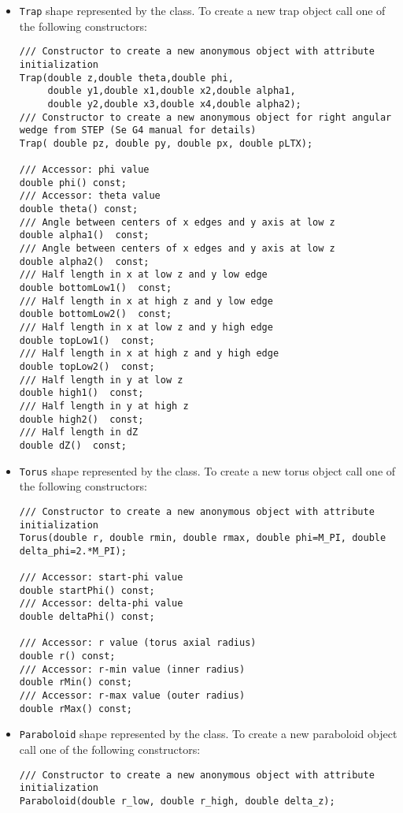 \begin{itemize}
\item \texttt{Trap} shape represented by the  class. To create a new trap object call one of the following constructors:
\begin{verbatim}
/// Constructor to create a new anonymous object with attribute initialization
Trap(double z,double theta,double phi,
     double y1,double x1,double x2,double alpha1,
     double y2,double x3,double x4,double alpha2);
/// Constructor to create a new anonymous object for right angular wedge from STEP (Se G4 manual for details)
Trap( double pz, double py, double px, double pLTX);

/// Accessor: phi value
double phi() const;
/// Accessor: theta value
double theta() const;
/// Angle between centers of x edges and y axis at low z
double alpha1()  const;
/// Angle between centers of x edges and y axis at low z
double alpha2()  const;
/// Half length in x at low z and y low edge
double bottomLow1()  const;
/// Half length in x at high z and y low edge
double bottomLow2()  const;
/// Half length in x at low z and y high edge
double topLow1()  const;
/// Half length in x at high z and y high edge
double topLow2()  const;
/// Half length in y at low z
double high1()  const;
/// Half length in y at high z
double high2()  const;
/// Half length in dZ
double dZ()  const;
\end{verbatim}

\item \texttt{Torus}  shape represented by the  class. To create a new torus object call one of the following constructors:
\begin{verbatim}
/// Constructor to create a new anonymous object with attribute initialization
Torus(double r, double rmin, double rmax, double phi=M_PI, double delta_phi=2.*M_PI);

/// Accessor: start-phi value
double startPhi() const;
/// Accessor: delta-phi value
double deltaPhi() const;

/// Accessor: r value (torus axial radius)
double r() const;
/// Accessor: r-min value (inner radius)
double rMin() const;
/// Accessor: r-max value (outer radius)
double rMax() const;
\end{verbatim}

\item \texttt{Paraboloid}  shape represented by the  class. To create a new paraboloid object call one of the following constructors:
\begin{verbatim}
/// Constructor to create a new anonymous object with attribute initialization
Paraboloid(double r_low, double r_high, double delta_z);


\end{verbatim}
\end{itemize}
